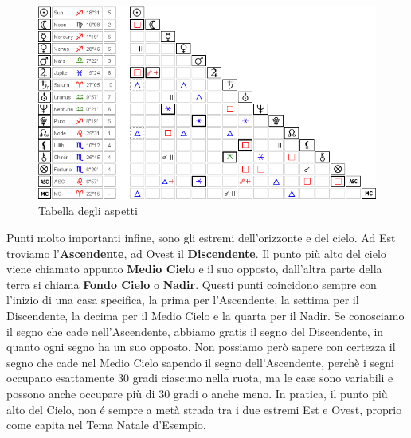 \begin{figure}[H]
\includegraphics[width=\textwidth,height=\textheight,keepaspectratio]{img/aspect.png}
\caption{Tabella degli aspetti}
\label{fig:aspect}
\end{figure}
Punti molto importanti infine, sono gli estremi dell'orizzonte e del cielo. Ad Est troviamo l'\textbf{Ascendente}, ad Ovest il \textbf{Discendente}. Il punto più alto del cielo viene chiamato appunto \textbf{Medio Cielo} e il suo opposto, dall'altra parte della terra si chiama \textbf{Fondo Cielo} o \textbf{Nadir}. Questi punti coincidono sempre con l'inizio di una casa specifica, la prima per l'Ascendente, la settima per il Discendente, la decima per il Medio Cielo e la quarta per il Nadir.\newline
Se conosciamo il segno che cade nell'Ascendente, abbiamo gratis il segno del Discendente, in quanto ogni segno ha un suo opposto. Non possiamo però sapere con certezza il segno che cade nel Medio Cielo sapendo il segno dell'Ascendente, perchè i segni occupano esattamente 30 gradi ciascuno nella ruota, ma le case sono variabili e possono anche occupare più di 30 gradi o anche meno.
In pratica, il punto più alto del Cielo, non é sempre a metà strada tra i due estremi Est e Ovest, proprio come capita nel Tema Natale d'Esempio.
